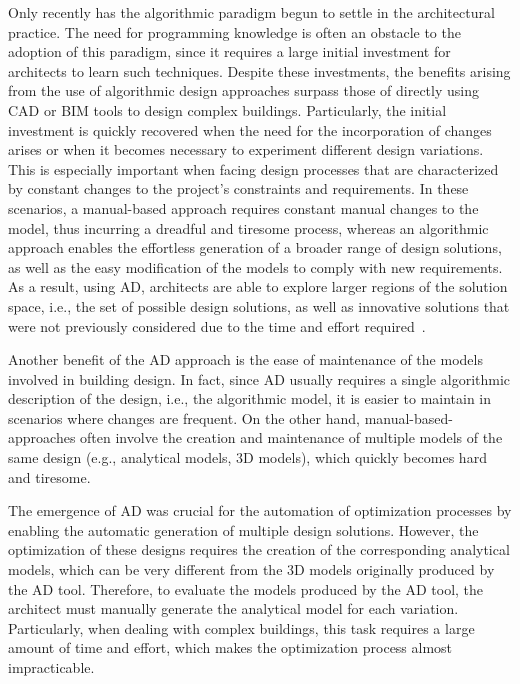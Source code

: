 Only recently has the algorithmic paradigm begun to settle in the architectural practice. The need for programming knowledge is often an obstacle to the adoption of this paradigm, since it requires a large initial investment for architects to learn such techniques. Despite these investments, the benefits arising from the use of algorithmic design approaches surpass those of directly using \ac{CAD} or \ac{BIM} tools to design complex buildings. Particularly, the initial investment is quickly recovered when the need for the incorporation of changes arises or when it becomes necessary to experiment different design variations. This is especially important when facing design processes that are characterized by constant changes to the project's constraints and requirements. In these scenarios, a manual-based approach requires constant manual changes to the model, thus incurring a dreadful and tiresome process, whereas an algorithmic approach enables the effortless generation of a broader range of design solutions, as well as the easy modification of the models to comply with new requirements. As a result, using \ac{AD}, architects are able to explore larger regions of the solution space, i.e., the set of possible design solutions, as well as innovative solutions that were not previously considered due to the time and effort required~\cite{Leitao2014GD}.

Another benefit of the \ac{AD} approach is the ease of maintenance of the models involved in building design. In fact, since \ac{AD} usually requires a single algorithmic description of the design, i.e., the algorithmic model, it is easier to maintain in scenarios where changes are frequent. On the other hand, manual-based-approaches often involve the creation and maintenance of multiple models of the same design (e.g., analytical models, 3D models), which quickly becomes hard and tiresome.

The emergence of \ac{AD} was crucial for the automation of optimization processes by enabling the automatic generation of multiple design solutions. However, the optimization of these designs requires the creation of the corresponding analytical models, which can be very different from the 3D models originally produced by the \ac{AD} tool. Therefore, to evaluate the models produced by the \ac{AD} tool, the architect must manually generate the analytical model for each variation. Particularly, when dealing with complex buildings, this task requires a large amount of time and effort, which makes the optimization process almost impracticable.

